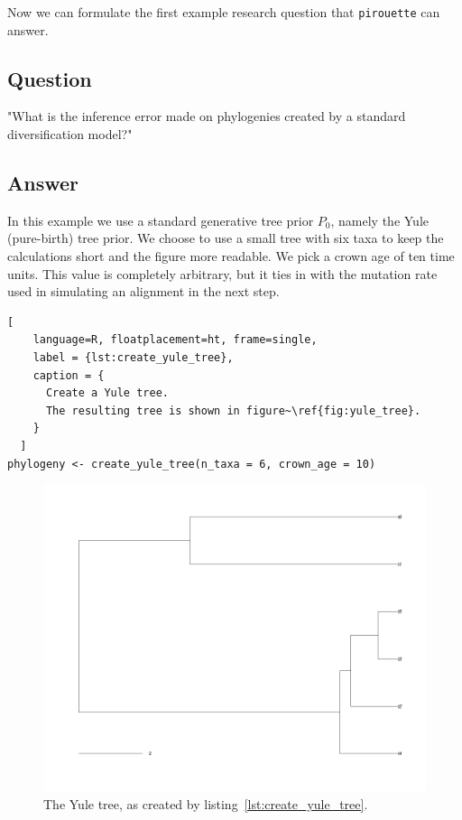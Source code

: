 \documentclass{article}
\begin{document}
Now we can formulate the first example research question that \verb;pirouette; 
can answer.

\subsection{Question}

"What is the inference error made on phylogenies
created by a standard diversification model?"

\subsection{Answer}

In this example we use a standard generative tree prior $\mathit{P_{0}}$, 
namely the Yule (pure-birth) tree prior. 
We choose to use a small tree with six taxa to keep
the calculations short and the figure more readable.
We pick a crown age of ten time units. This value is 
completely arbitrary, but it ties in with the mutation rate 
used in simulating an alignment in the next step.

\begin{lstlisting}[
    language=R, floatplacement=ht, frame=single, 
    label = {lst:create_yule_tree}, 
    caption = {
      Create a Yule tree. 
      The resulting tree is shown in figure~\ref{fig:yule_tree}.
    }
  ]
phylogeny <- create_yule_tree(n_taxa = 6, crown_age = 10)
\end{lstlisting}

\begin{figure}[ht]
  \includegraphics[width=\textwidth]{example_1/true_tree.png}
  \caption{The Yule tree, as created by listing~\ref{lst:create_yule_tree}.}
  \label{fig:yule_tree}
\end{figure}
\end{document}
